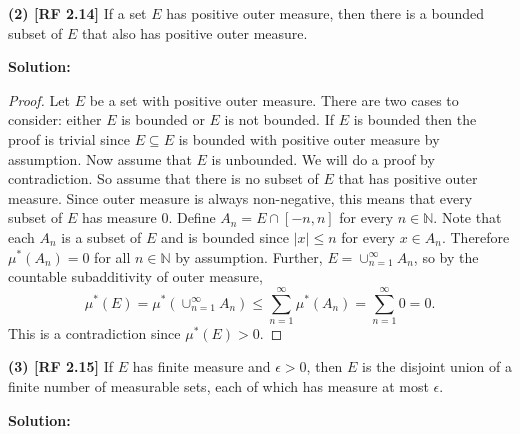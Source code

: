 \documentclass[12pt]{article}
\begin{document}
{\bf (2) [RF 2.14]} If a set $E$ has positive outer measure, then there is a bounded subset of $E$ that also has positive outer measure.

{\bf Solution:}

\begin{proof}
Let $E$ be a set with positive outer measure. There are two cases to consider: either $E$ is bounded or $E$ is not bounded. If $E$ is bounded then the
proof is trivial since $E \subseteq E$ is bounded with positive outer measure by assumption. Now assume that $E$ is unbounded. We will do a proof by
contradiction. So assume that there is no subset of $E$ that has positive outer measure. Since outer measure is always non-negative, this means that
every subset of $E$ has measure 0. Define $A_{n} = E \cap [-n, n]$ for every $n \in \mathbb{N}$. Note that each $A_{n}$ is a subset of $E$ and is bounded since $|x| \leq n$
for every $x \in A_{n}$. Therefore $\mu^{*}(A_{n}) = 0$ for all $n \in \mathbb{N}$ by assumption. Further, $E = \cup_{n=1}^{\infty}A_{n}$, so by the countable subadditivity of outer measure,
\[ \mu^{*}(E) = \mu^{*}\left( \cup_{n=1}^{\infty}A_{n} \right) \leq \sum_{n=1}^{\infty}\mu^{*}(A_{n}) = \sum_{n=1}^{\infty} 0 = 0. \]
This is a contradiction since $\mu^{*}(E) > 0$.  
\end{proof}

{\bf (3) [RF 2.15]} If $E$ has finite measure and $\epsilon > 0$, then $E$ is the disjoint union of a finite number of measurable sets, each of which
has measure at most $\epsilon$.

{\bf Solution:} 
\end{document}
